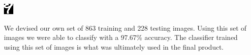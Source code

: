 \begin{center}
\begin{minipage}[h!]{.9\linewidth}
\begin{minipage}[h!]{0.9\textwidth}
\begin{center}
\includegraphics[width=.3\linewidth]{images/mnist4.png}
\end{center}
\end{minipage}
\vspace{5 mm}
\end{minipage}
\end{center}

We devised our own set of 863 training and 228 testing images. Using this set of images we were able to classify with a 97.67\% accuracy. The classifier trained using this set of images is what was ultimately used in the final product.

